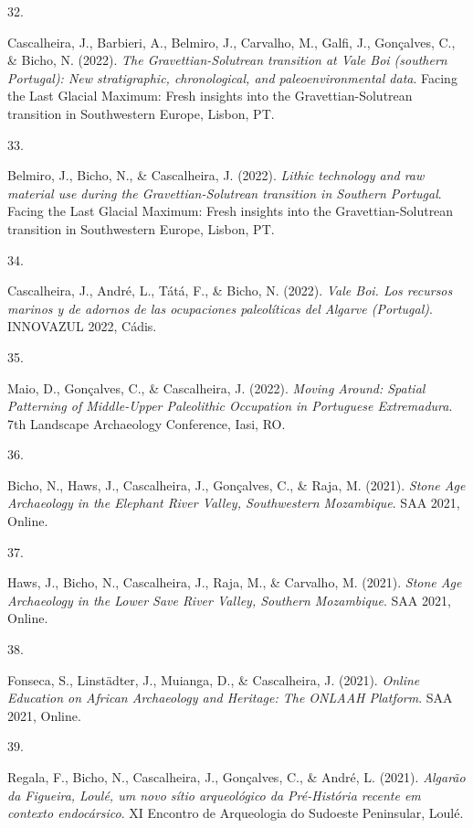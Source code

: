 \documentclass[11pt,a4paper,]{awesome-cv}
\newlength{\cslhangindent}
\newlength{\csllabelwidth}
\newenvironment{CSLReferences}[2] %
 {\begin{list}{}{%
  \setlength{\itemindent}{0pt}
  \setlength{\leftmargin}{0pt}
  \setlength{\parsep}{0pt}
  \ifodd #1
   \setlength{\leftmargin}{\cslhangindent}
   \setlength{\itemindent}{-1\cslhangindent}
  \fi
  \setlength{\itemsep}{#2\baselineskip}}}
 {\end{list}}
\newcommand{\CSLLeftMargin}[1]{\parbox[t]{\csllabelwidth}{\strut#1\strut}}
\newcommand{\CSLRightInline}[1]{\parbox[t]{\linewidth - \csllabelwidth}{\strut#1\strut}}
\begin{document}
\begin{CSLReferences}{0}{0}
\CSLLeftMargin{32. }%
\CSLRightInline{Cascalheira, J., Barbieri, A., Belmiro, J., Carvalho,
M., Galfi, J., Gonçalves, C., \& Bicho, N. (2022). \emph{The
Gravettian-Solutrean transition at Vale Boi (southern Portugal): New
stratigraphic, chronological, and paleoenvironmental data}. Facing the
Last Glacial Maximum: Fresh insights into the Gravettian-Solutrean
transition in Southwestern Europe, Lisbon, PT.}

\CSLLeftMargin{33. }%
\CSLRightInline{Belmiro, J., Bicho, N., \& Cascalheira, J. (2022).
\emph{Lithic technology and raw material use during the
Gravettian-Solutrean transition in Southern Portugal}. Facing the Last
Glacial Maximum: Fresh insights into the Gravettian-Solutrean transition
in Southwestern Europe, Lisbon, PT.}

\CSLLeftMargin{34. }%
\CSLRightInline{Cascalheira, J., André, L., Tátá, F., \& Bicho, N.
(2022). \emph{Vale Boi. Los recursos marinos y de adornos de las
ocupaciones paleolíticas del Algarve (Portugal)}. INNOVAZUL 2022,
Cádis.}

\CSLLeftMargin{35. }%
\CSLRightInline{Maio, D., Gonçalves, C., \& Cascalheira, J. (2022).
\emph{Moving Around: Spatial Patterning of Middle-Upper Paleolithic
Occupation in Portuguese Extremadura}. 7th Landscape Archaeology
Conference, Iasi, RO.}

\CSLLeftMargin{36. }%
\CSLRightInline{Bicho, N., Haws, J., Cascalheira, J., Gonçalves, C., \&
Raja, M. (2021). \emph{Stone Age Archaeology in the Elephant River
Valley, Southwestern Mozambique}. SAA 2021, Online.}

\CSLLeftMargin{37. }%
\CSLRightInline{Haws, J., Bicho, N., Cascalheira, J., Raja, M., \&
Carvalho, M. (2021). \emph{Stone Age Archaeology in the Lower Save River
Valley, Southern Mozambique}. SAA 2021, Online.}

\CSLLeftMargin{38. }%
\CSLRightInline{Fonseca, S., Linstädter, J., Muianga, D., \&
Cascalheira, J. (2021). \emph{Online Education on African Archaeology
and Heritage: The ONLAAH Platform}. SAA 2021, Online.}

\CSLLeftMargin{39. }%
\CSLRightInline{Regala, F., Bicho, N., Cascalheira, J., Gonçalves, C.,
\& André, L. (2021). \emph{Algarão da Figueira, Loulé, um novo sítio
arqueológico da Pré-História recente em contexto endocársico}. XI
Encontro de Arqueologia do Sudoeste Peninsular, Loulé.}


\end{CSLReferences}
\end{document}
